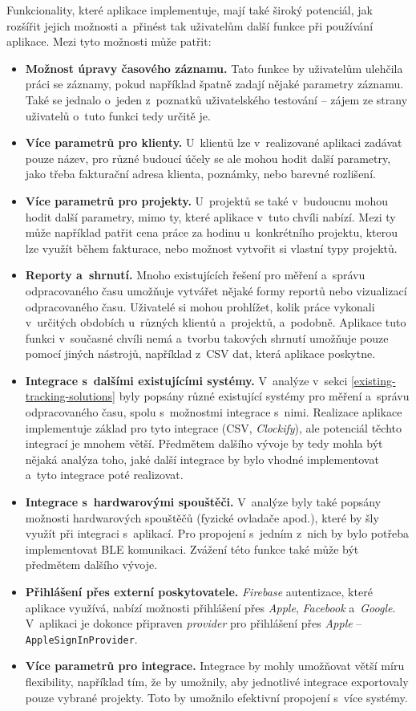 Funkcionality, které aplikace implementuje, mají také široký potenciál, jak rozšířit jejich možnosti a~přinést tak uživatelům další funkce při používání aplikace. Mezi tyto možnosti může patřit:
\begin{itemize}
\item\textbf{Možnost úpravy časového záznamu.} Tato funkce by uživatelům ulehčila práci se záznamy, pokud například špatně zadají nějaké parametry záznamu. Také se jednalo o~jeden z~poznatků uživatelského testování – zájem ze strany uživatelů o~tuto funkci tedy určitě je.
\item\textbf{Více parametrů pro klienty.} U~klientů lze v~realizované aplikaci zadávat pouze název, pro různé budoucí účely se ale mohou hodit další parametry, jako třeba fakturační adresa klienta, poznámky, nebo barevné rozlišení.
\item\textbf{Více parametrů pro projekty.} U~projektů se také v~budoucnu mohou hodit další parametry, mimo ty, které aplikace v~tuto chvíli nabízí. Mezi ty může například patřit cena práce za hodinu u~konkrétního projektu, kterou lze využít během fakturace, nebo možnost vytvořit si vlastní typy projektů. 
\item\textbf{Reporty a~shrnutí.} Mnoho existujících řešení pro měření a~správu odpracovaného času umožňuje vytvářet nějaké formy reportů nebo vizualizací odpracovaného času. Uživatelé si mohou prohlížet, kolik práce vykonali v~určitých obdobích u~různých klientů a~projektů, a~podobně. Aplikace tuto funkci v~současné chvíli nemá a~tvorbu takových shrnutí umožňuje pouze pomocí jiných nástrojů, například z~CSV dat, která aplikace poskytne.
\item\textbf{Integrace s~dalšími existujícími systémy.} V~analýze v~sekci \ref{existing-tracking-solutions} byly popsány různé existující systémy pro měření a~správu odpracovaného času, spolu s~možnostmi integrace s~nimi. Realizace aplikace implementuje základ pro tyto integrace (CSV, \emph{Clockify}), ale potenciál těchto integrací je mnohem větší. Předmětem dalšího vývoje by tedy mohla být nějaká analýza toho, jaké další integrace by bylo vhodné implementovat a~tyto integrace poté realizovat.
\item\textbf{Integrace s~hardwarovými spouštěči.} V~analýze byly také popsány možnosti hardwarových spouštěčů (fyzické ovladače apod.), které by šly využít při integraci s~aplikací. Pro propojení s~jedním z~nich by bylo potřeba implementovat BLE komunikaci. Zvážení této funkce také může být předmětem dalšího vývoje.
\item\textbf{Přihlášení přes externí poskytovatele.} \emph{Firebase} autentizace, které aplikace využívá, nabízí možnosti přihlášení přes \emph{Apple}, \emph{Facebook} a~\emph{Google}. V~aplikaci je dokonce připraven \emph{provider} pro přihlášení přes \emph{Apple} – \texttt{AppleSignInProvider}.
\item\textbf{Více parametrů pro integrace.} Integrace by mohly umožňovat větší míru flexibility, například tím, že by umožnily, aby jednotlivé integrace exportovaly pouze vybrané projekty. Toto by umožnilo efektivní propojení s~více systémy.
\end{itemize}

